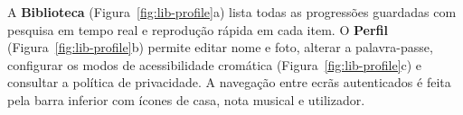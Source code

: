 A \textbf{Biblioteca} (Figura~\ref{fig:lib-profile}a) lista todas as progressões guardadas com pesquisa em tempo real e reprodução rápida em cada item. O \textbf{Perfil} (Figura~\ref{fig:lib-profile}b) permite editar nome e foto, alterar a palavra-passe, configurar os modos de acessibilidade cromática (Figura~\ref{fig:lib-profile}c) e consultar a política de privacidade. A navegação entre ecrãs autenticados é feita pela barra inferior com ícones de casa, nota musical e utilizador.
